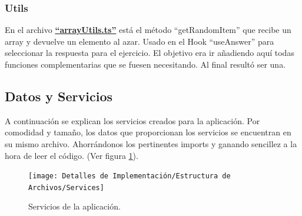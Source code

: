 \documentclass[12pt,twoside,titlepage]{report}
\begin{document}
\subsubsection{Utils}
En el archivo \href{https://github.com/alberttogoca/EarFit/blob/main/src/utils/arrayUtils.ts}{\textbf{``arrayUtils.ts''}} está el método ``getRandomItem'' que recibe un array y devuelve un elemento al azar. Usado en el Hook ``useAnswer'' para seleccionar la respuesta para el ejercicio. El objetivo era ir añadiendo aquí todas funciones complementarias que se fuesen necesitando. Al final resultó ser una.

\subsection{Datos y Servicios}
\label{sec:datos}
\label{sec:servicios}

A continuación se explican los servicios creados para la aplicación. Por comodidad y tamaño, los datos que proporcionan los servicios se encuentran en su mismo archivo. Ahorrándonos los pertinentes imports y ganando sencillez a la hora de leer el código.
(Ver figura \ref{fig:Services}).

\begin{figure}[H]
    \centering
    \texttt{[image: Detalles de Implementación/Estructura de Archivos/Services]}
    \caption{Servicios de la aplicación.}
    \label{fig:Services}
\end{figure}
\end{document}
